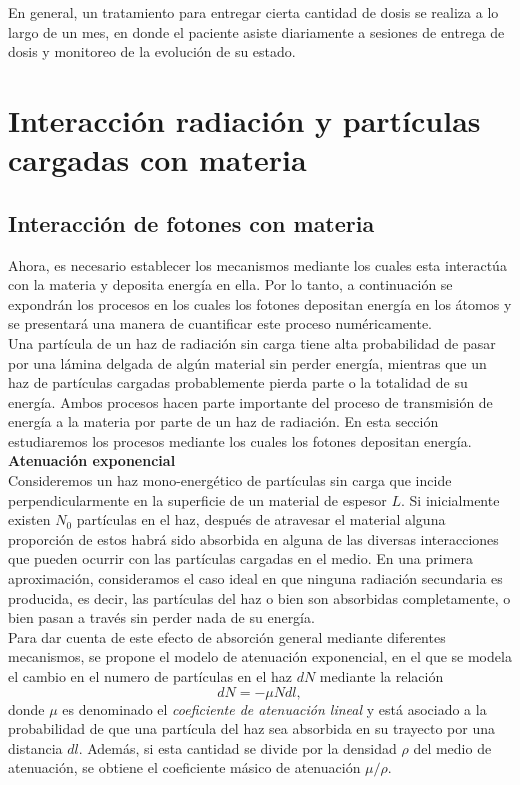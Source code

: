 En general, un tratamiento para entregar cierta cantidad de dosis se realiza a lo largo de un mes, en donde el paciente asiste diariamente a sesiones de entrega de dosis y monitoreo de la evolución de su estado. \\    

\section{Interacción radiación y partículas cargadas con materia}
\subsection{Interacción de fotones con materia}
Ahora, es necesario establecer los mecanismos mediante los cuales esta interactúa con la materia y deposita energía en ella. Por lo tanto, a continuación se expondrán los procesos en los cuales los fotones depositan energía en los átomos y se presentará una manera de cuantificar este proceso numéricamente.  \\

Una partícula de un haz de radiación sin carga tiene alta probabilidad de pasar por una lámina delgada de algún material sin perder energía, mientras que un haz de partículas cargadas probablemente pierda parte o la totalidad de su energía. Ambos procesos hacen parte importante del proceso de transmisión de energía a la materia por parte de un haz de radiación. En esta sección estudiaremos los procesos mediante los cuales los fotones depositan energía.\\

\noindent
\textbf{Atenuación exponencial}\\


Consideremos un haz mono-energético de partículas sin carga que incide perpendicularmente en la superficie de un material de espesor $L$. Si inicialmente existen $N_0$ partículas en el haz, después de atravesar el material alguna proporción de estos habrá sido absorbida en alguna de las diversas interacciones que pueden ocurrir con las partículas cargadas en el medio. En una primera aproximación, consideramos el caso ideal en que ninguna radiación secundaria es producida, es decir, las partículas del haz o bien son absorbidas completamente, o bien pasan a través sin perder nada de su energía.\\

Para dar cuenta de este efecto de absorción general mediante diferentes mecanismos, se propone el modelo de atenuación exponencial, en el que se modela el cambio en el numero de partículas en el haz $dN$ mediante la relación
\begin{equation}
	dN=-\mu N dl,
\end{equation}  
donde $\mu$ es denominado el \textit{coeficiente de atenuación lineal} y está asociado a la probabilidad de que una partícula del haz sea absorbida en su trayecto por una distancia $dl$. Además, si esta cantidad se divide por la densidad $\rho$ del medio de atenuación, se obtiene el coeficiente másico de atenuación $\mu/\rho$.\\

